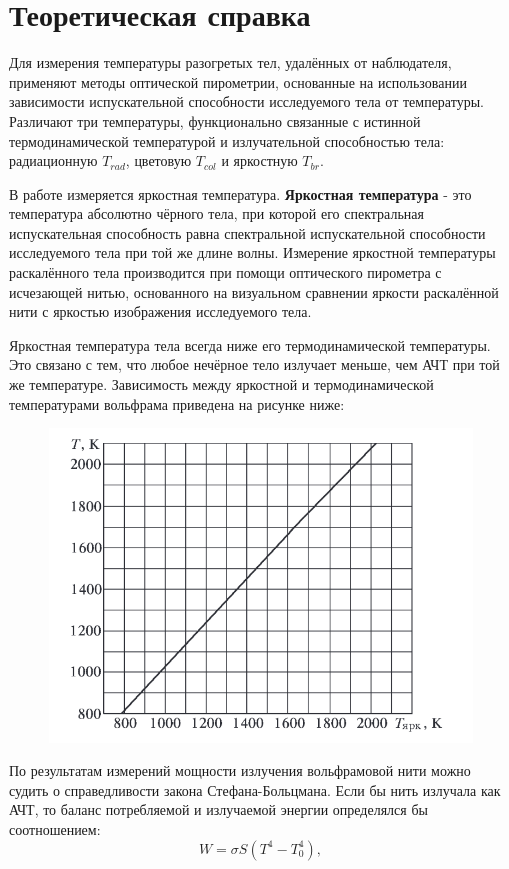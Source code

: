 \documentclass[a4paper, 12pt]{article}
\begin{document}
\tableofcontents
\newpage

\section{Теоретическая справка} 

    Для измерения температуры разогретых тел, удалённых от наблюдателя, применяют методы оптической пирометрии, 
    основанные на использовании зависимости испускательной способности исследуемого тела от температуры. 
    Различают три температуры, функционально связанные с истинной термодинамической температурой и излучательной способностью тела: 
    радиационную $T_{rad}$, цветовую $T_{col}$ и яркостную $T_{br}$. \par
    В работе измеряется яркостная температура. \textbf{Яркостная температура} - это температура 
    абсолютно чёрного тела, при которой его спектральная испускательная способность равна спектральной испускательной 
    способности исследуемого тела при той же длине волны.
    Измерение яркостной температуры раскалённого тела производится при помощи оптического пирометра с исчезающей нитью, 
    основанного на визуальном сравнении яркости раскалённой нити с яркостью изображения исследуемого тела. \par
    Яркостная температура тела всегда ниже его термодинамической температуры. Это связано с тем, 
    что любое нечёрное тело излучает меньше, чем АЧТ при той же температуре. Зависимость между яркостной и 
    термодинамической температурами вольфрама приведена на рисунке ниже:

    \begin{figure}[H]
        \centering
        \includegraphics[width=0.7\linewidth]{res/1.png}
    \end{figure}

    По результатам измерений мощности излучения вольфрамовой нити можно судить о справедливости 
    закона Стефана-Больцмана. Если бы нить излучала как АЧТ, 
    то баланс потребляемой и излучаемой энергии определялся бы соотношением:
    \begin{equation}
        W = \sigma S (T^4 - T_0^4),
    \end{equation} 
    
\end{document}
